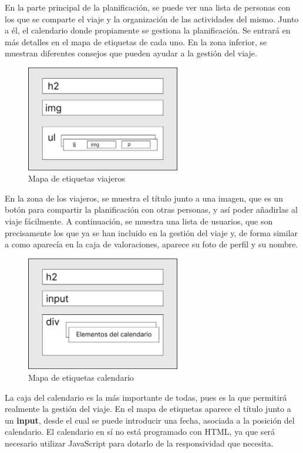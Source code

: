 \documentclass[11pt, a4paper]{book}
\begin{document}
	En la parte principal de la planificación, se puede ver una lista de personas con los que se comparte el viaje y la organización de las actividades del mismo. Junto a él, el calendario donde propiamente se gestiona la planificación. Se entrará en más detalles en el mapa de etiquetas de cada uno. En la zona inferior, se muestran diferentes consejos que pueden ayudar a la gestión del viaje.
	
	\begin{figure} [H]
		\centering
		\includegraphics[width=0.6\textwidth]{HTML/Etiq-viajeros.jpg}
		\caption{Mapa de etiquetas viajeros}
	\end{figure}

	En la zona de los viajeros, se muestra el título junto a una imagen, que es un botón para compartir la planificación con otras personas, y así poder añadirlas al viaje fácilmente. A continuación, se muestra una lista de usuarios, que son precisamente los que ya se han incluido en la gestión del viaje y, de forma similar a como aparecía en la caja de valoraciones, aparece su foto de perfil y su nombre.

	\begin{figure} [H]
		\centering
		\includegraphics[width=0.6\textwidth]{HTML/Etiq-calendario.jpg}
		\caption{Mapa de etiquetas calendario}
	\end{figure}

	La caja del calendario es la más importante de todas, pues es la que permitirá realmente la gestión del viaje. En el mapa de etiquetas aparece el título junto a un \textbf{input}, desde el cual se puede introducir una fecha, asociada a la posición del calendario. El calendario en sí no está programado con HTML, ya que será necesario utilizar JavaScript para dotarlo de la responsividad que necesita.
\end{document}
